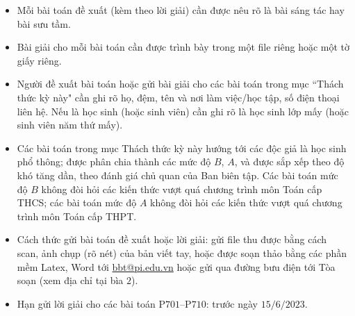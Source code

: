 \thispagestyle{thachthuctoanhocnone}
\pagestyle{thachthuctoanhoc}
\everymath{\color{thachthuctoanhoc}}
\graphicspath{{../thachthuctoanhoc/pic/}}
\begingroup
{}
\centering
\vspace*{4cm}
\endgroup
\vspace*{-8pt}
\begin{tBox}
	\begin{itemize}[leftmargin = 13pt, itemsep = 1.0pt] 
		\item Mỗi bài toán đề xuất (kèm theo lời giải) cần được nêu rõ là bài sáng tác hay bài sưu tầm.
		\item Bài giải cho mỗi bài toán cần được trình bày trong một file riêng hoặc
		một tờ giấy riêng.
		\item  Người đề xuất bài toán hoặc gửi bài giải cho các bài toán trong mục ``Thách thức kỳ này" cần ghi rõ họ, đệm, tên và nơi làm việc/học tập, số điện thoại liên hệ. Nếu là học sinh (hoặc sinh viên) cần ghi rõ là học sinh lớp mấy (hoặc sinh viên năm thứ mấy).
		\item Các bài toán trong mục Thách thức kỳ này hướng tới các độc giả là học sinh phổ thông; được phân chia thành các mức độ $B$, $A$, và được sắp xếp theo độ khó tăng dần, theo đánh giá chủ quan của Ban biên tập. Các bài toán mức độ $B$ không đòi hỏi các kiến thức vượt quá chương trình môn Toán cấp THCS; các bài toán mức độ $A$ không đòi hỏi các kiến thức vượt quá chương trình môn Toán cấp THPT.
		\item Cách thức gửi bài toán đề xuất hoặc lời giải: gửi file thu được bằng cách scan, ảnh chụp (rõ nét) của bản viết tay, hoặc được soạn thảo bằng các phần mềm Latex, Word tới \url{bbt@pi.edu.vn} hoặc gửi qua đường bưu điện tới Tòa soạn (xem địa chỉ tại bìa $2$).
		\item Hạn gửi lời giải cho các bài toán P$701$--P$710$: trước ngày $15/6/2023$.
	\end{itemize}
\end{tBox}
